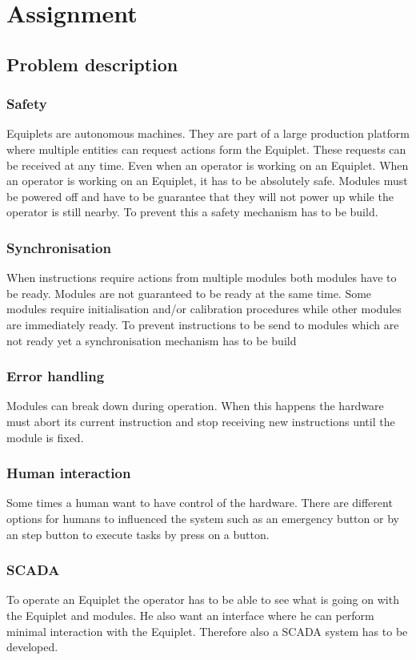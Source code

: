 \chapter{Assignment}
\section{Problem description}
\subsection{Safety}
Equiplets are autonomous machines. 
They are part of a large production platform where multiple entities can request actions form the Equiplet. These requests can be received at any time. Even when an operator is working on an Equiplet. When an operator is working on an Equiplet, it has to be absolutely safe.
Modules must be powered off and have to be guarantee that they will not power up while the operator is still nearby.
To prevent this a safety mechanism has to be build.
\subsection{Synchronisation}
When instructions require actions from multiple modules both modules have to be ready.
Modules are not guaranteed to be ready at the same time. Some modules require initialisation  and/or calibration procedures while other modules are immediately ready. 
To prevent instructions to be send to modules which are not ready yet a synchronisation mechanism has to be build
\subsection{Error handling}
Modules can break down during operation. When this happens the hardware must abort its current instruction and stop receiving new instructions until the module is fixed.
\subsection{Human interaction}
Some times a human want to have control of the hardware. There are different options for humans to influenced the system such as an emergency button or by an step button to execute tasks by press on a button.

\subsection{SCADA}
To operate an Equiplet the operator has to be able to see what is going on with the Equiplet and modules. He also want an interface where he can perform minimal interaction with the Equiplet. Therefore also a SCADA system has to be developed.

